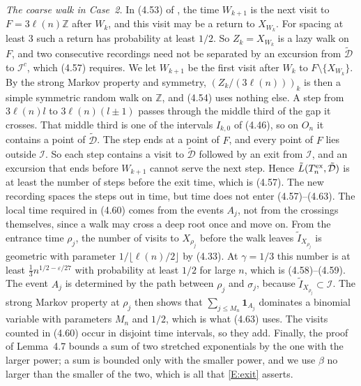 \documentclass[11pt]{amsart}
\theoremstyle{remark}
\numberwithin{equation}{section}
\newcommand{\Z}{\mathbb{Z}}
\begin{document}
\emph{The coarse walk in Case~2.} In (4.53) of \cite{DNNS}, the time $W_{k+1}$ is the next visit to $F=3\ell(n)\Z$ after $W_k$, and this visit may be a return to $X_{W_k}$. For spacing at least $3$ such a return has probability at least $1/2$. So $Z_k=X_{W_k}$ is a lazy walk on $F$, and two consecutive recordings need not be separated by an excursion from $\tilde{\mathcal D}$ to $\mathcal I^c$, which (4.57) requires. We let $W_{k+1}$ be the first visit after $W_k$ to $F\setminus\{X_{W_k}\}$. By the strong Markov property and symmetry, $(Z_k/(3\ell(n)))_k$ is then a simple symmetric random walk on $\Z$, and (4.54) uses nothing else. A step from $3\ell(n)l$ to $3\ell(n)(l\pm1)$ passes through the middle third of the gap it crosses. That middle third is one of the intervals $I_{k,0}$ of (4.46), so on $O_n$ it contains a point of $\tilde{\mathcal D}$. The step ends at a point of $F$, and every point of $F$ lies outside $\mathcal I$. So each step contains a visit to $\tilde{\mathcal D}$ followed by an exit from $\mathcal I$, and an excursion that ends before $W_{k+1}$ cannot serve the next step. Hence $\tilde L(T^{\rm ex}_n,\tilde{\mathcal D})$ is at least the number of steps before the exit time, which is (4.57). The new recording spaces the steps out in time, but time does not enter (4.57)--(4.63). The local time required in (4.60) comes from the events $A_j$, not from the crossings themselves, since a walk may cross a deep root once and move on. From the entrance time $\rho_j$, the number of visits to $X_{\rho_j}$ before the walk leaves $\tilde I_{X_{\rho_j}}$ is geometric with parameter $1/\lfloor\ell(n)/2\rfloor$ by (4.33). At $\gamma=1/3$ this number is at least $\frac13n^{1/2-\varepsilon/27}$ with probability at least $1/2$ for large $n$, which is (4.58)--(4.59). The event $A_j$ is determined by the path between $\rho_j$ and $\sigma_j$, because $\tilde I_{X_{\rho_j}}\subset\mathcal I$. The strong Markov property at $\rho_j$ then shows that $\sum_{j\le M_n}\mathbf 1_{A_j}$ dominates a binomial variable with parameters $M_n$ and $1/2$, which is what (4.63) uses. The visits counted in (4.60) occur in disjoint time intervals, so they add. Finally, the proof of Lemma~4.7 bounds a sum of two stretched exponentials by the one with the larger power; a sum is bounded only with the smaller power, and we use $\beta$ no larger than the smaller of the two, which is all that \ref{E:exit} asserts.
\end{document}
